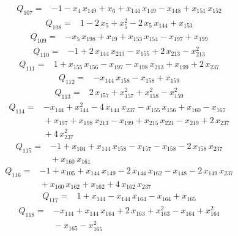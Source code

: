 \documentclass[11pt]{article}
\theoremstyle{definition}\newtheorem{definition}[theorem]{Definition}
\begin{document}
\begin{align*}
Q_{107}={}&-1-x_{4}\,x_{149}+x_{6}+x_{144}\,x_{149}-x_{148}+x_{151}\,x_{152}
\end{align*}
\begin{align*}
Q_{108}={}&1-2\,x_{5}+x_{5}^{2}-2\,x_{5}\,x_{144}+x_{153}
\end{align*}
\begin{align*}
Q_{109}={}&-x_{5}\,x_{198}+x_{19}+x_{153}\,x_{154}-x_{197}+x_{199}
\end{align*}
\begin{align*}
Q_{110}={}&-1+2\,x_{144}\,x_{213}-x_{155}+2\,x_{213}-x_{213}^{2}
\end{align*}
\begin{align*}
Q_{111}={}&1+x_{155}\,x_{156}-x_{197}-x_{198}\,x_{213}+x_{199}+2\,x_{237}
\end{align*}
\begin{align*}
Q_{112}={}&-x_{144}\,x_{158}-x_{158}+x_{159}
\end{align*}
\begin{align*}
Q_{113}={}&2\,x_{157}+x_{157}^{2}+x_{158}^{2}-x_{159}^{2}
\end{align*}
\begin{align*}
Q_{114}={}&-x_{144}+x_{144}^{2}-4\,x_{144}\,x_{237}-x_{155}\,x_{156}+x_{160}-x_{167}
\\ &{}+x_{197}+x_{198}\,x_{213}-x_{199}+x_{215}\,x_{221}-x_{219}+2\,x_{237}
\\ &{}+4\,x_{237}^{2}
\end{align*}
\begin{align*}
Q_{115}={}&-1+x_{104}+x_{144}\,x_{158}-x_{157}-x_{158}-2\,x_{158}\,x_{237}
\\ &{}+x_{160}\,x_{161}
\end{align*}
\begin{align*}
Q_{116}={}&-1+x_{105}+x_{144}\,x_{149}-2\,x_{144}\,x_{162}-x_{148}-2\,x_{149}\,x_{237}
\\ &{}+x_{160}\,x_{162}+x_{162}+4\,x_{162}\,x_{237}
\end{align*}
\begin{align*}
Q_{117}={}&1+x_{144}-x_{144}\,x_{164}-x_{164}+x_{165}
\end{align*}
\begin{align*}
Q_{118}={}&-x_{144}+x_{144}\,x_{164}+2\,x_{163}+x_{163}^{2}-x_{164}+x_{164}^{2}
\\ &{}-x_{165}-x_{165}^{2}
\end{align*}
\end{document}
